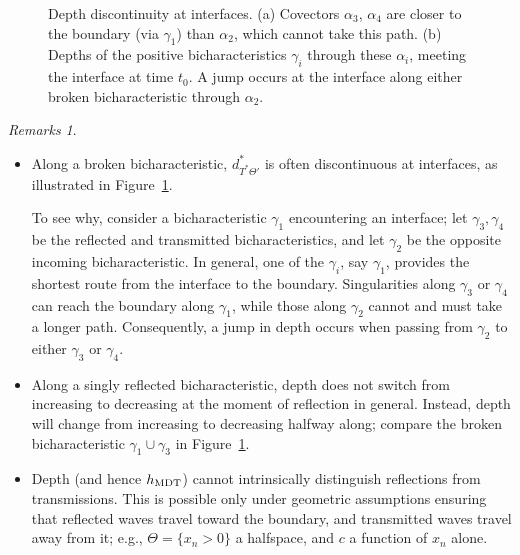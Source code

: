 \documentclass[10pt]{article}
\theoremstyle{plain}
\theoremstyle{definition}
\theoremstyle{remark}
\newtheorem*{remarks}{Remarks}
\numberwithin{theorem}{section}
\numberwithin{example}{section}
\numberwithin{equation}{section}
\numberwithin{figure}{section}
\newcommand\MDT{\ensuremath{_{\text{\normalfont MDT}}}}	%
\begin{document}
\begin{figure}
	\centering
	
	\centering
	\hbox{}\hfill
	\hfill
	\hfill\hbox{}

	\caption{Depth discontinuity at interfaces. (a) Covectors $\alpha_3$, $\alpha_4$ are closer to the boundary (via $\gamma_1$) than $\alpha_2$, which cannot take this path. (b) Depths of the positive bicharacteristics $\gamma_i$ through these $\alpha_i$, meeting the interface at time $t_0$. A jump occurs at the interface along either broken bicharacteristic through $\alpha_2$.}
	\label{f:discont-depth}
\end{figure}

\begin{remarks}\hfill	
\begin{itemize}
\item
	Along a broken bicharacteristic, $d^*_{T^*\Theta'}$ is often discontinuous at interfaces, as illustrated in Figure~\ref{f:discont-depth}.
	
	To see why, consider a bicharacteristic $\gamma_1$ encountering an interface; let $\gamma_3,\gamma_4$ be the reflected and transmitted bicharacteristics, and let $\gamma_2$ be the opposite incoming bicharacteristic. In general, one of the $\gamma_i$, say $\gamma_1$, provides the shortest route from the interface to the boundary. Singularities along $\gamma_3$ or $\gamma_4$ can reach the boundary along $\gamma_1$, while those along $\gamma_2$ cannot and must take a longer path. Consequently, a jump in depth occurs when passing from $\gamma_2$ to either $\gamma_3$ or $\gamma_4$.

\item
	Along a singly reflected bicharacteristic, depth does not switch from increasing to decreasing at the moment of reflection in general. Instead, depth will change from increasing to decreasing halfway along; compare the broken bicharacteristic $\gamma_1\cup\gamma_3$ in Figure~\ref{f:discont-depth}.

\item
	Depth (and hence $h\MDT$) cannot intrinsically distinguish reflections from transmissions. This is possible only under geometric assumptions ensuring that reflected waves travel toward the boundary, and transmitted waves travel away from it; e.g., $\Theta=\{x_n>0\}$ a half\-space, and $c$ a function of $x_n$ alone.
	
\end{itemize}
\end{remarks}
\end{document}

